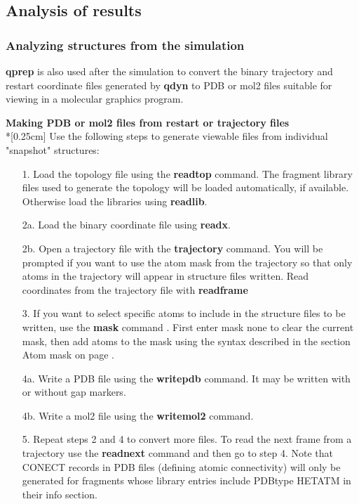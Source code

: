 \documentclass[a4paper,10pt]{article}
\begin{document}
\subsection{Analysis of results}

\subsubsection{Analyzing structures from the simulation}
\label{subsubsec:Analyzing_struc_f_t_sim} \textbf{qprep} is also used after
the simulation to convert the binary trajectory and restart
coordinate files generated by \textbf{qdyn} to PDB or mol2 files suitable
for viewing in a molecular graphics program.

\textbf{Making PDB or mol2 files from restart or trajectory
files}\\*[0.25cm] Use the following steps to generate viewable
files from individual
"snapshot" structures: \\

\begin{itemize}
\item[1.] Load the topology file using the \textbf{readtop} command. The fragment
library files used to generate the topology will be loaded
automatically, if available. Otherwise load the libraries using
\textbf{readlib}.
\item[2a.] Load the binary coordinate file using \textbf{readx}.
\item[2b.] Open a trajectory file with the \textbf{trajectory} command. You
will be prompted if you want to use the atom mask from the
trajectory so that only atoms in the trajectory will appear in
structure files written. Read coordinates from the trajectory file
with \textbf{readframe}
\item[3.] If you want to select specific atoms to
include in the structure files to be written, use the
\textbf{mask} command . First enter mask none to clear the current
mask, then add atoms to the mask using the syntax described in the
section Atom mask on page \pageref{subsubsec:atom_masks}.
\item[4a.] Write a PDB file using the \textbf{writepdb} command. It may be written
with or without gap markers.
\item[4b.] Write a mol2 file using the \textbf{writemol2} command.
\item[5.] Repeat steps 2 and 4 to convert more
files. To read the next frame from a trajectory use the
\textbf{readnext} command and then go to step 4. Note that CONECT
records in PDB files (defining atomic connectivity) will only be
generated for fragments whose library entries include PDBtype
HETATM in their info section.
\end{itemize}
\end{document}
